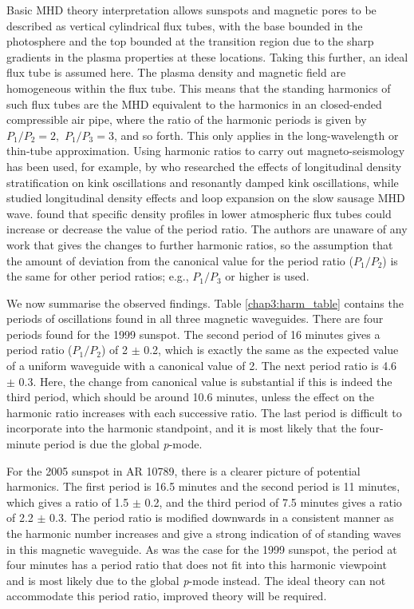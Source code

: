 	Basic MHD theory interpretation allows sunspots and magnetic pores to be described as vertical cylindrical flux tubes, with the base bounded in the photosphere and the top bounded at the transition region due to the sharp gradients in the plasma properties at these locations.
	Taking this further, an ideal flux tube is assumed here.
	The plasma density and magnetic field are homogeneous within the flux tube.
	This means that the standing harmonics of such flux tubes are the MHD equivalent to the harmonics in an closed-ended compressible air pipe, where the ratio of the harmonic periods is given by \, $P_{1}/P_{2}=2, \,\, P_{1}/P_{3}=3$, and so forth.
	This only applies in the long-wavelength or thin-tube approximation.
	Using harmonic ratios to carry out magneto-seismology has been used, for example, by \citet{2005ApJ...624L..57A,2005A&A...430.1109A} who researched the effects of longitudinal density stratification on kink oscillations and resonantly damped kink oscillations, while \citet{luna-cardozo} studied longitudinal density effects and loop expansion on the slow sausage MHD wave.
	\citet{luna-cardozo} found that specific density profiles in lower atmospheric flux tubes could increase or decrease the value of the period ratio.
	The authors are unaware of any work that gives the changes to further harmonic ratios, so the assumption that the amount of deviation from the canonical value for the period ratio ($P_{1}/P_{2}$) is the same for other period ratios; e.g., $P_{1}/P_{3}$ or higher is used.
	
	We now summarise the observed findings. Table \ref{chap3:harm_table} contains the periods of oscillations found in all three magnetic waveguides.
	There are four periods found for the 1999 sunspot.
	The second period of 16 minutes gives a period ratio ($P_{1}/P_{2}$) of 2 $\pm$ 0.2, which is exactly the same as the expected value of a uniform waveguide with a canonical value of 2.
	The next period ratio is 4.6 $\pm$ 0.3.
	Here, the change from canonical value is substantial if this is indeed the third period, which should be around 10.6 minutes, unless the effect on the harmonic ratio increases with each successive ratio.
	The last period is difficult to incorporate into the harmonic standpoint, and it is most likely that the four-minute period is due the global \textit{p}-mode.
	
	For the 2005 sunspot in AR 10789, there is a clearer picture of potential harmonics.
	The first period is 16.5 minutes and the second period is 11 minutes, which gives a ratio of 1.5 $\pm$ 0.2, and the third period of 7.5 minutes gives a ratio of 2.2 $\pm$ 0.3.
	The period ratio is modified downwards in a consistent manner as the harmonic number increases and give a strong indication of of standing waves in this magnetic waveguide.
	As was the case for the 1999 sunspot, the period at four minutes has a period ratio that does not fit into this harmonic viewpoint and is most likely due to the global \textit{p}-mode instead.
	The ideal theory can not accommodate this period ratio, improved theory will be required.
	
